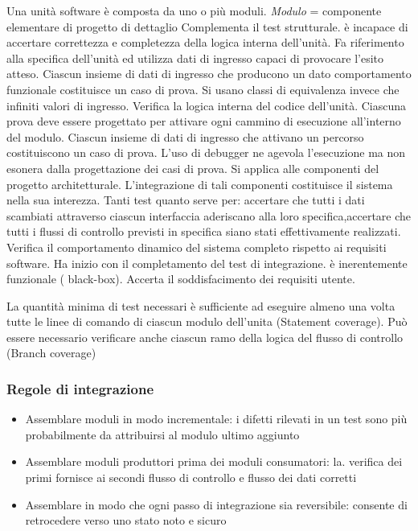 Una unità software è composta da uno o più moduli. \textit{Modulo} = componente elementare di progetto di dettaglio
Complementa il test strutturale. è incapace di accertare correttezza e completezza della logica interna dell'unità. Fa riferimento alla specifica dell'unità ed utilizza dati di ingresso capaci di provocare l'esito atteso. Ciascun insieme di dati di ingresso che producono un dato comportamento funzionale costituisce un caso di prova. Si usano classi di equivalenza invece che infiniti valori di ingresso.
Verifica la logica interna del codice dell'unità. Ciascuna prova deve essere progettato per attivare ogni cammino di esecuzione all'interno del modulo. Ciascun insieme di dati di ingresso che attivano un
percorso costituiscono un caso di prova. L'uso di debugger ne agevola l'esecuzione ma non esonera dalla progettazione dei casi di prova.
Si applica alle componenti del progetto architetturale. L'integrazione di tali componenti costituisce il sistema nella sua interezza. Tanti test quanto serve per: accertare che tutti i dati scambiati attraverso ciascun interfaccia aderiscano alla loro specifica,accertare che tutti i flussi di controllo previsti in specifica siano stati effettivamente realizzati.
Verifica il comportamento dinamico del sistema completo rispetto ai requisiti software. Ha inizio con il completamento del test di integrazione. è inerentemente funzionale ( black-box).
Accerta il soddisfacimento dei requisiti utente.

La quantità minima di test necessari è sufficiente ad eseguire almeno una volta tutte le linee di comando di ciascun modulo dell'unita (Statement coverage).
Può essere necessario verificare anche ciascun ramo della logica del flusso di controllo (Branch coverage)

\subsubsection{Regole di integrazione}
\begin{itemize}
\item Assemblare moduli in modo incrementale: i difetti rilevati in un test sono più probabilmente da attribuirsi al modulo ultimo aggiunto
\item Assemblare moduli produttori prima dei moduli consumatori: la. verifica dei primi fornisce ai secondi flusso di controllo e flusso dei dati corretti
\item Assemblare in modo che ogni passo di integrazione sia reversibile: consente di retrocedere verso uno stato noto e sicuro
\end{itemize}

